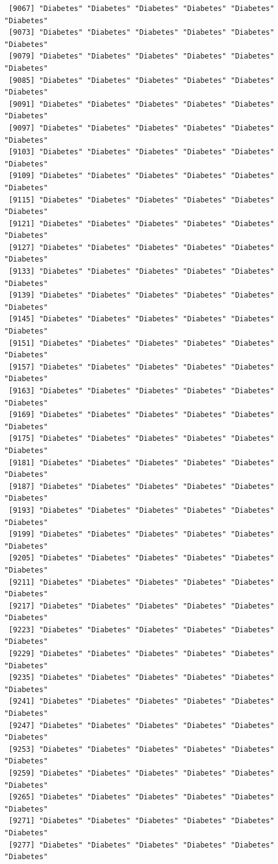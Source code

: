 \documentclass[
  letterpaper,
  DIV=11,
  numbers=noendperiod]{scrartcl}
\begin{document}
\begin{verbatim}
 [9067] "Diabetes" "Diabetes" "Diabetes" "Diabetes" "Diabetes" "Diabetes"
 [9073] "Diabetes" "Diabetes" "Diabetes" "Diabetes" "Diabetes" "Diabetes"
 [9079] "Diabetes" "Diabetes" "Diabetes" "Diabetes" "Diabetes" "Diabetes"
 [9085] "Diabetes" "Diabetes" "Diabetes" "Diabetes" "Diabetes" "Diabetes"
 [9091] "Diabetes" "Diabetes" "Diabetes" "Diabetes" "Diabetes" "Diabetes"
 [9097] "Diabetes" "Diabetes" "Diabetes" "Diabetes" "Diabetes" "Diabetes"
 [9103] "Diabetes" "Diabetes" "Diabetes" "Diabetes" "Diabetes" "Diabetes"
 [9109] "Diabetes" "Diabetes" "Diabetes" "Diabetes" "Diabetes" "Diabetes"
 [9115] "Diabetes" "Diabetes" "Diabetes" "Diabetes" "Diabetes" "Diabetes"
 [9121] "Diabetes" "Diabetes" "Diabetes" "Diabetes" "Diabetes" "Diabetes"
 [9127] "Diabetes" "Diabetes" "Diabetes" "Diabetes" "Diabetes" "Diabetes"
 [9133] "Diabetes" "Diabetes" "Diabetes" "Diabetes" "Diabetes" "Diabetes"
 [9139] "Diabetes" "Diabetes" "Diabetes" "Diabetes" "Diabetes" "Diabetes"
 [9145] "Diabetes" "Diabetes" "Diabetes" "Diabetes" "Diabetes" "Diabetes"
 [9151] "Diabetes" "Diabetes" "Diabetes" "Diabetes" "Diabetes" "Diabetes"
 [9157] "Diabetes" "Diabetes" "Diabetes" "Diabetes" "Diabetes" "Diabetes"
 [9163] "Diabetes" "Diabetes" "Diabetes" "Diabetes" "Diabetes" "Diabetes"
 [9169] "Diabetes" "Diabetes" "Diabetes" "Diabetes" "Diabetes" "Diabetes"
 [9175] "Diabetes" "Diabetes" "Diabetes" "Diabetes" "Diabetes" "Diabetes"
 [9181] "Diabetes" "Diabetes" "Diabetes" "Diabetes" "Diabetes" "Diabetes"
 [9187] "Diabetes" "Diabetes" "Diabetes" "Diabetes" "Diabetes" "Diabetes"
 [9193] "Diabetes" "Diabetes" "Diabetes" "Diabetes" "Diabetes" "Diabetes"
 [9199] "Diabetes" "Diabetes" "Diabetes" "Diabetes" "Diabetes" "Diabetes"
 [9205] "Diabetes" "Diabetes" "Diabetes" "Diabetes" "Diabetes" "Diabetes"
 [9211] "Diabetes" "Diabetes" "Diabetes" "Diabetes" "Diabetes" "Diabetes"
 [9217] "Diabetes" "Diabetes" "Diabetes" "Diabetes" "Diabetes" "Diabetes"
 [9223] "Diabetes" "Diabetes" "Diabetes" "Diabetes" "Diabetes" "Diabetes"
 [9229] "Diabetes" "Diabetes" "Diabetes" "Diabetes" "Diabetes" "Diabetes"
 [9235] "Diabetes" "Diabetes" "Diabetes" "Diabetes" "Diabetes" "Diabetes"
 [9241] "Diabetes" "Diabetes" "Diabetes" "Diabetes" "Diabetes" "Diabetes"
 [9247] "Diabetes" "Diabetes" "Diabetes" "Diabetes" "Diabetes" "Diabetes"
 [9253] "Diabetes" "Diabetes" "Diabetes" "Diabetes" "Diabetes" "Diabetes"
 [9259] "Diabetes" "Diabetes" "Diabetes" "Diabetes" "Diabetes" "Diabetes"
 [9265] "Diabetes" "Diabetes" "Diabetes" "Diabetes" "Diabetes" "Diabetes"
 [9271] "Diabetes" "Diabetes" "Diabetes" "Diabetes" "Diabetes" "Diabetes"
 [9277] "Diabetes" "Diabetes" "Diabetes" "Diabetes" "Diabetes" "Diabetes"

\end{verbatim}
\end{document}
